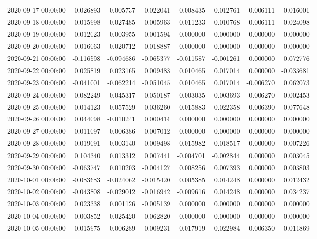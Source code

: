 \begin{tabular}{lrrrrrrr}
2020-09-17 00:00:00 & 0.026893 & 0.005737 & 0.022041 & -0.008435 & -0.012761 & 0.006111 & 0.016001 \\
2020-09-18 00:00:00 & -0.015998 & -0.027485 & -0.005963 & -0.011233 & -0.010768 & 0.006111 & -0.024098 \\
2020-09-19 00:00:00 & 0.012023 & 0.003955 & 0.001594 & 0.000000 & 0.000000 & 0.000000 & 0.000000 \\
2020-09-20 00:00:00 & -0.016063 & -0.020712 & -0.018887 & 0.000000 & 0.000000 & 0.000000 & 0.000000 \\
2020-09-21 00:00:00 & -0.116598 & -0.094686 & -0.065377 & -0.011587 & -0.001261 & 0.000000 & 0.072776 \\
2020-09-22 00:00:00 & 0.025819 & 0.023165 & 0.009483 & 0.010465 & 0.017014 & 0.000000 & -0.033681 \\
2020-09-23 00:00:00 & -0.041001 & -0.062214 & -0.051045 & 0.010465 & 0.017014 & -0.006270 & 0.062073 \\
2020-09-24 00:00:00 & 0.082249 & 0.045317 & 0.050187 & 0.003035 & 0.003693 & -0.006270 & -0.002453 \\
2020-09-25 00:00:00 & 0.014123 & 0.057529 & 0.036260 & 0.015883 & 0.022358 & -0.006390 & -0.077648 \\
2020-09-26 00:00:00 & 0.044098 & -0.010241 & 0.000414 & 0.000000 & 0.000000 & 0.000000 & 0.000000 \\
2020-09-27 00:00:00 & -0.011097 & -0.006386 & 0.007012 & 0.000000 & 0.000000 & 0.000000 & 0.000000 \\
2020-09-28 00:00:00 & 0.019091 & -0.003140 & -0.009498 & 0.015982 & 0.018517 & 0.000000 & -0.007226 \\
2020-09-29 00:00:00 & 0.104340 & 0.013312 & 0.007441 & -0.004701 & -0.002844 & 0.000000 & 0.003045 \\
2020-09-30 00:00:00 & -0.063747 & 0.010203 & -0.004127 & 0.008256 & 0.007393 & 0.000000 & 0.003803 \\
2020-10-01 00:00:00 & -0.083683 & -0.024062 & -0.015420 & 0.005385 & 0.014248 & 0.000000 & 0.012432 \\
2020-10-02 00:00:00 & -0.043808 & -0.029012 & -0.016942 & -0.009616 & 0.014248 & 0.000000 & 0.034237 \\
2020-10-03 00:00:00 & 0.023338 & 0.001126 & -0.005139 & 0.000000 & 0.000000 & 0.000000 & 0.000000 \\
2020-10-04 00:00:00 & -0.003852 & 0.025420 & 0.062820 & 0.000000 & 0.000000 & 0.000000 & 0.000000 \\
2020-10-05 00:00:00 & 0.015975 & 0.006289 & 0.009231 & 0.017919 & 0.022984 & 0.006350 & 0.011869 \\

\end{tabular}
